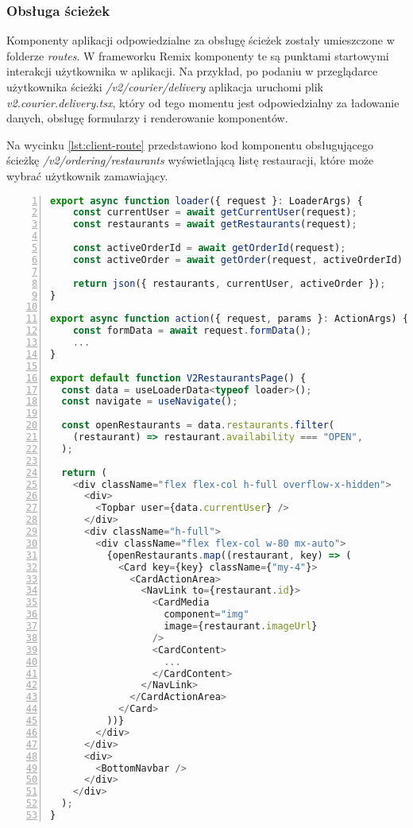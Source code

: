 \subsubsection{Obsługa ścieżek}

Komponenty aplikacji odpowiedzialne za obsługę ścieżek zostały umieszczone w folderze \textit{routes}. W frameworku Remix komponenty te są punktami startowymi interakcji użytkownika w aplikacji. Na przykład, po podaniu w przeglądarce użytkownika ścieżki \textit{/v2/courier/delivery} aplikacja uruchomi plik \textit{v2.courier.delivery.tsx}, który od tego momentu jest odpowiedzialny za ładowanie danych, obsługę formularzy i renderowanie komponentów.

Na wycinku \ref{lst:client-route} przedstawiono kod komponentu obsługującego ścieżkę \textit{/v2/ordering/restaurants} wyświetlającą listę restauracji, które może wybrać użytkownik zamawiający.

\begin{lstlisting}[caption={Kod ścieżki wyświetlającej listę dostępnych restauracji - \textit{/v2/ordering/restaurants}},label={lst:client-route},captionpos=b,language=JavaScript,numbers=left,showstringspaces=false]
export async function loader({ request }: LoaderArgs) {
    const currentUser = await getCurrentUser(request);
    const restaurants = await getRestaurants(request);
  
    const activeOrderId = await getOrderId(request);
    const activeOrder = await getOrder(request, activeOrderId)
  
    return json({ restaurants, currentUser, activeOrder });
}

export async function action({ request, params }: ActionArgs) {
    const formData = await request.formData();
    ...
}

export default function V2RestaurantsPage() {
  const data = useLoaderData<typeof loader>();
  const navigate = useNavigate();

  const openRestaurants = data.restaurants.filter(
    (restaurant) => restaurant.availability === "OPEN",
  );

  return (
    <div className="flex flex-col h-full overflow-x-hidden">
      <div>
        <Topbar user={data.currentUser} />
      </div>
      <div className="h-full">
        <div className="flex flex-col w-80 mx-auto">
          {openRestaurants.map((restaurant, key) => (
            <Card key={key} className={"my-4"}>
              <CardActionArea>
                <NavLink to={restaurant.id}>
                  <CardMedia
                    component="img"
                    image={restaurant.imageUrl}
                  />
                  <CardContent>
                    ...
                  </CardContent>
                </NavLink>
              </CardActionArea>
            </Card>
          ))}
        </div>
      </div>
      <div>
        <BottomNavbar />
      </div>
    </div>
  );
}      
\end{lstlisting}
      
